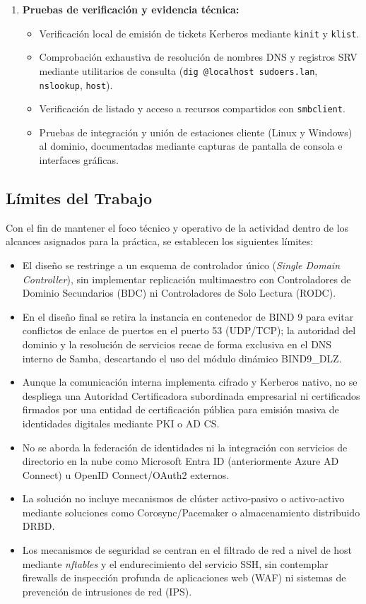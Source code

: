 \begin{enumerate}[label=\textbf{\arabic*.}]
    \item \textbf{Pruebas de verificación y evidencia técnica:}
    \begin{itemize}
        \item Verificación local de emisión de tickets Kerberos mediante \texttt{kinit} y \texttt{klist}.
        \item Comprobación exhaustiva de resolución de nombres DNS y registros SRV mediante utilitarios de consulta (\texttt{dig @localhost sudoers.lan}, \texttt{nslookup}, \texttt{host}).
        \item Verificación de listado y acceso a recursos compartidos con \texttt{smbclient}.
        \item Pruebas de integración y unión de estaciones cliente (Linux y Windows) al dominio, documentadas mediante capturas de pantalla de consola e interfaces gráficas.
    \end{itemize}
\end{enumerate}

\subsection{Límites del Trabajo}

Con el fin de mantener el foco técnico y operativo de la actividad dentro de los alcances asignados para la práctica, se establecen los siguientes límites:

\begin{itemize}
    \item El diseño se restringe a un esquema de controlador único (\textit{Single Domain Controller}), sin implementar replicación multimaestro con Controladores de Dominio Secundarios (BDC) ni Controladores de Solo Lectura (RODC).
    \item En el diseño final se retira la instancia en contenedor de BIND 9 para evitar conflictos de enlace de puertos en el puerto 53 (UDP/TCP); la autoridad del dominio y la resolución de servicios recae de forma exclusiva en el DNS interno de Samba, descartando el uso del módulo dinámico BIND9\_DLZ.
    \item Aunque la comunicación interna implementa cifrado y Kerberos nativo, no se despliega una Autoridad Certificadora subordinada empresarial ni certificados firmados por una entidad de certificación pública para emisión masiva de identidades digitales mediante PKI o AD CS.
    \item No se aborda la federación de identidades ni la integración con servicios de directorio en la nube como Microsoft Entra ID (anteriormente Azure AD Connect) u OpenID Connect/OAuth2 externos.
    \item La solución no incluye mecanismos de clúster activo-pasivo o activo-activo mediante soluciones como Corosync/Pacemaker o almacenamiento distribuido DRBD.
    \item Los mecanismos de seguridad se centran en el filtrado de red a nivel de host mediante \textit{nftables} y el endurecimiento del servicio SSH, sin contemplar firewalls de inspección profunda de aplicaciones web (WAF) ni sistemas de prevención de intrusiones de red (IPS).
\end{itemize}

